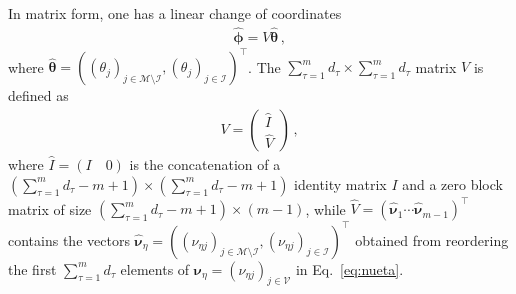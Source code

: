 \documentclass[aps,pre,reprint,longbibliography,superscriptaddress,noshowpacs,floatfix]{revtex4-2}
\theoremstyle{definition}
\theoremstyle{remark}
\begin{document}
In matrix form, one has a linear change of coordinates
\begin{align}\label{eq:monomial_change_coord}
    \hat{\bm{\phi}} = V\hat{\bm{\theta}}\,,
\end{align}
where $\hat{\bm{\theta}} = ((\theta_j)_{j\in \mathcal{M}\setminus \mathcal{I}}, (\theta_j)_{j\in \mathcal{I}})^\top$.
The $\sum_{\tau=1}^md_\tau\times \sum_{\tau=1}^md_\tau$ matrix $V$ is defined as
\begin{align}\label{eq:Vmatrix}
    V = \begin{pmatrix} 
        \hat{I} \\
        \hat{V}
    \end{pmatrix}\,,
\end{align}
where $\hat{I} = (I\quad 0)$ is the concatenation of a $(\sum_{\tau=1}^md_\tau - m + 1)\times (\sum_{\tau=1}^md_\tau - m + 1)$ identity matrix $I$ and a zero block matrix of size $(\sum_{\tau=1}^md_\tau - m + 1)\times (m- 1)$, while $\hat{V} = (\hat{\bm{\nu}}_1\cdots\hat{\bm{\nu}}_{m-1})^\top$ contains the vectors $\hat{\bm{\nu}}_\eta = ((\nu_{\eta j})_{j\in \mathcal{M}\setminus \mathcal{I}}, (\nu_{\eta j})_{j\in \mathcal{I}})^\top$ obtained from reordering the first $\sum_{\tau = 1}^m d_\tau$ elements of $\bm{\nu}_\eta = (\nu_{\eta j})_{j\in \mathcal{V}}$ in Eq.~\eqref{eq:nueta}. 
\end{document}
